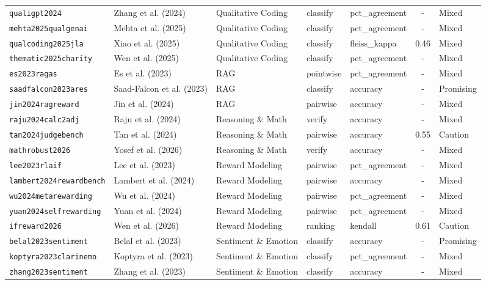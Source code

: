 \begin{longtable}{@{}l l l l l c l@{}}
\texttt{qualigpt2024} & Zhang et al. (2024) & Qualitative Coding & classify & pct\_agreement & - & Mixed \\
\texttt{mehta2025qualgenai} & Mehta et al. (2025) & Qualitative Coding & classify & pct\_agreement & - & Mixed \\
\texttt{qualcoding2025jla} & Xiao et al. (2025) & Qualitative Coding & classify & fleiss\_kappa & 0.46 & Mixed \\
\texttt{thematic2025charity} & Wen et al. (2025) & Qualitative Coding & classify & pct\_agreement & - & Mixed \\
\texttt{es2023ragas} & Es et al. (2023) & RAG & pointwise & pct\_agreement & - & Mixed \\
\texttt{saadfalcon2023ares} & Saad-Falcon et al. (2023) & RAG & classify & accuracy & - & Promising \\
\texttt{jin2024ragreward} & Jin et al. (2024) & RAG & pairwise & accuracy & - & Mixed \\
\texttt{raju2024calc2adj} & Raju et al. (2024) & Reasoning \& Math & verify & accuracy & - & Mixed \\
\texttt{tan2024judgebench} & Tan et al. (2024) & Reasoning \& Math & pairwise & accuracy & 0.55 & Caution \\
\texttt{mathrobust2026} & Yosef et al. (2026) & Reasoning \& Math & verify & accuracy & - & Mixed \\
\texttt{lee2023rlaif} & Lee et al. (2023) & Reward Modeling & pairwise & pct\_agreement & - & Mixed \\
\texttt{lambert2024rewardbench} & Lambert et al. (2024) & Reward Modeling & pairwise & accuracy & - & Mixed \\
\texttt{wu2024metarewarding} & Wu et al. (2024) & Reward Modeling & pairwise & pct\_agreement & - & Mixed \\
\texttt{yuan2024selfrewarding} & Yuan et al. (2024) & Reward Modeling & pairwise & pct\_agreement & - & Mixed \\
\texttt{ifreward2026} & Wen et al. (2026) & Reward Modeling & ranking & kendall & 0.61 & Caution \\
\texttt{belal2023sentiment} & Belal et al. (2023) & Sentiment \& Emotion & classify & accuracy & - & Promising \\
\texttt{koptyra2023clarinemo} & Koptyra et al. (2023) & Sentiment \& Emotion & classify & pct\_agreement & - & Mixed \\
\texttt{zhang2023sentiment} & Zhang et al. (2023) & Sentiment \& Emotion & classify & accuracy & - & Mixed \\

\end{longtable}
